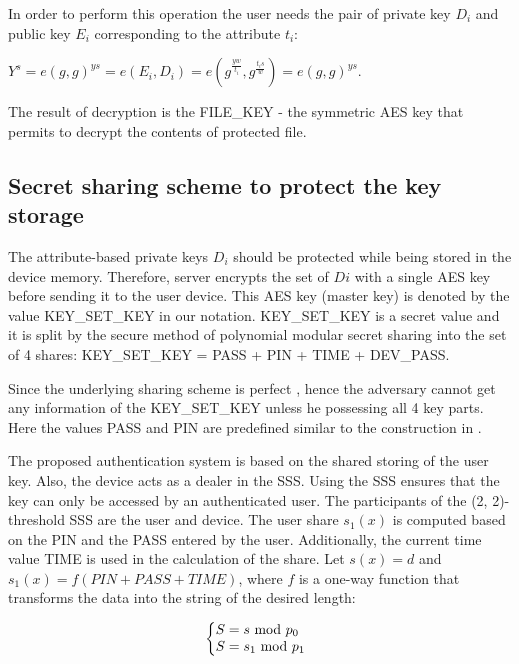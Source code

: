 \documentclass[twocolumn]{svjour3}          	%
\begin{document}
In order to perform this operation the user needs the pair of private key $D_i$ and public key $E_i$ corresponding to the attribute $t_i$: 

$Y^s = e(g,g)^{ys} = e(E_i,D_i) = e(g^{\frac{yw}{t_i}},g^{\frac{t_is}{w}})=e(g,g)^{ys}$.

The result of decryption is the FILE\_KEY - the symmetric AES key that permits to decrypt the contents of protected file. 

\subsection{Secret sharing scheme to protect the key storage }
\label{sec_secret}

The attribute-based private keys $D_i$ should be protected while being stored in the device memory. Therefore, server encrypts the set of $Di$ with a single AES key before sending it to the user device. This AES key (master key) is denoted by the value KEY\_SET\_KEY in our notation. KEY\_SET\_KEY is a secret value and it is split by the secure method of polynomial modular secret sharing \cite{galibus2015mobile, galibus2008some} into the set of 4 shares: KEY\_SET\_KEY = PASS + PIN + TIME + DEV\_PASS. 

Since the underlying sharing scheme is perfect \cite{galibus2008some}, hence the adversary cannot get any information of the KEY\_SET\_KEY unless he possessing all 4 key parts. Here the values PASS and PIN are predefined similar to the construction in \cite{galibus2015mobile}.

The proposed authentication system is based on the shared storing of the user key. Also, the device acts as a dealer in the SSS. Using the SSS ensures that the key can only be accessed by an authenticated user. The participants of the (2, 2)-threshold SSS are the user and device. The user share $s_1(x)$ is computed based on the PIN and the PASS entered by the user. Additionally, the current time value TIME is used in the calculation of the share. Let $s(x) = d$ and $s_1(x) = f(PIN + PASS + TIME)$, where $f$ is a one-way function that transforms the data into the string of the desired length: 

\begin{equation}\label{eq:eq01}
  \left\{
  \begin{array}{@{}ll@{}}
    S = s \textrm{ mod } p_0
    \\
    S = s_1 \textrm{ mod } p_1
  \end{array}\right.
\end{equation}
\end{document}
